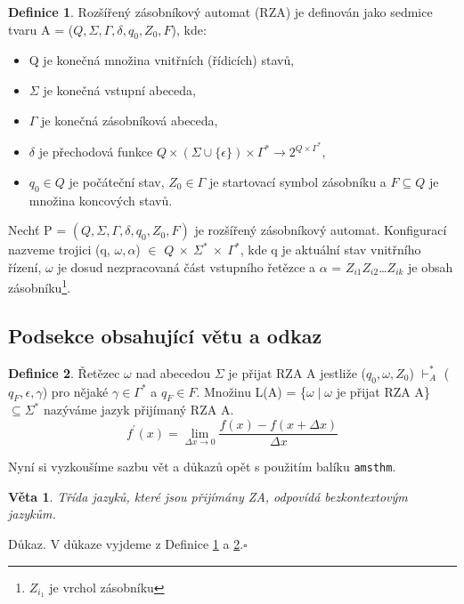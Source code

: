 \documentclass[a4paper, 11pt, twocolumn] {article}
\theoremstyle{definition}
\newtheorem{defi}{Definice}
\theoremstyle{plain}
\newtheorem{veta}{Věta}
\begin{document}
\begin{defi}
\label{definice1}
Rozšířený zásobníkový automat (RZA) je definován jako sedmice tvaru A = (\(Q, \Sigma, \Gamma, \delta, q_0, Z_0, F\)),
kde:
\begin{itemize}
	\setlength\itemsep{0.1em}
	\item Q je konečná množina vnitřních (řídicích) stavů,
	\item $\Sigma$ je konečná vstupní abeceda,
	\item $\Gamma$ je konečná zásobníková abeceda,
	\item $\delta$ je přechodová funkce $Q\times(\Sigma \cup \{\epsilon\})\times\Gamma^*\to2^{Q\times\Gamma^*}$,
	\item $q_0 \in Q$ je počáteční stav, $Z_0 \in \Gamma$ je startovací symbol
	zásobníku a $F \subseteq Q$ je množina koncových stavů.
\end{itemize}

Nechť P = $(Q, \Sigma, \Gamma, \delta, q_0, Z_0, F)$ je rozšířený zásobníkový automat. Konfigurací nazveme trojici (q, $\omega, \alpha$) $\in$
$Q~\times~\Sigma^*~\times~\Gamma^*$, kde q je aktuální stav vnitřního řízení,
$\omega$ je dosud nezpracovaná část vstupního řetězce a $\alpha$ =
$Z_{i1}Z_{i2}$\dots $Z_{ik}$ je obsah zásobníku\footnote{$Z_{i_1}$
je vrchol zásobníku}.
\end{defi}

\subsection{Podsekce obsahující větu a odkaz}
\begin{defi}
\label{definice2} 
Řetězec $\omega$ nad abecedou $\Sigma$ je přijat RZA
A jestliže ($q_0, \omega, Z_0$) ${\displaystyle \vdash_A^*}$ ($q_F,\epsilon,\gamma$) pro nějaké $\gamma \in \Gamma^*$ a $q_F \in F.$ Množinu L(A) = \{$\omega \mid \omega$ je přijat RZA A\} $\subseteq \Sigma^*$ nazýváme jazyk přijímaný RZA A.\\
$$
f^{\prime}(x)=\lim _{\Delta x \rightarrow 0} \frac{f(x)-f(x+\Delta x)}{\Delta x}
$$

Nyní si vyzkoušíme sazbu vět a důkazů opět s použitím
balíku \texttt{amsthm}.\\
\vspace{-1.5em}
\begin{veta}Třída jazyků, které jsou přijímány ZA, odpovídá
			bezkontextovým jazykům.\\
\end{veta}
\vspace{-2.5em}
\begin{flushleft}Důkaz. V důkaze vyjdeme z Definice \ref{definice1} a 								 \ref{definice2}.\hfill $\square$
\end{flushleft}
\end{defi}
\end{document}
